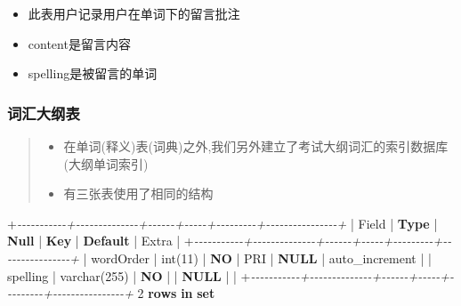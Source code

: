 \documentclass[
]{article}
\newenvironment{Shaded}{}{}
\newcommand{\CommentTok}[1]{\textcolor[rgb]{0.38,0.63,0.69}{\textit{#1}}}
\newcommand{\DataTypeTok}[1]{\textcolor[rgb]{0.56,0.13,0.00}{#1}}
\newcommand{\DecValTok}[1]{\textcolor[rgb]{0.25,0.63,0.44}{#1}}
\newcommand{\KeywordTok}[1]{\textcolor[rgb]{0.00,0.44,0.13}{\textbf{#1}}}
\newcommand{\NormalTok}[1]{#1}
\newcommand{\OperatorTok}[1]{\textcolor[rgb]{0.40,0.40,0.40}{#1}}
\begin{document}
\begin{itemize}
\item
  此表用户记录用户在单词下的留言批注
\item
  content是留言内容
\item
  spelling是被留言的单词
\end{itemize}

\hypertarget{ux8bcdux6c47ux5927ux7eb2ux8868}{%
\subsubsection{词汇大纲表}\label{ux8bcdux6c47ux5927ux7eb2ux8868}}

\begin{quote}
\begin{itemize}
\item
  在单词(释义)表(词典)之外,我们另外建立了考试大纲词汇的索引数据库(大纲单词索引)
\item
  有三张表使用了相同的结构
\end{itemize}
\end{quote}

\begin{Shaded}
\begin{Highlighting}[]
\OperatorTok{+}\CommentTok{{-}{-}{-}{-}{-}{-}{-}{-}{-}{-}{-}+{-}{-}{-}{-}{-}{-}{-}{-}{-}{-}{-}{-}{-}{-}+{-}{-}{-}{-}{-}{-}+{-}{-}{-}{-}{-}+{-}{-}{-}{-}{-}{-}{-}{-}{-}+{-}{-}{-}{-}{-}{-}{-}{-}{-}{-}{-}{-}{-}{-}{-}{-}+}
\NormalTok{| Field     | }\KeywordTok{Type}\NormalTok{         | }\KeywordTok{Null}\NormalTok{ | }\KeywordTok{Key}\NormalTok{ | }\KeywordTok{Default}\NormalTok{ | Extra          |}
\OperatorTok{+}\CommentTok{{-}{-}{-}{-}{-}{-}{-}{-}{-}{-}{-}+{-}{-}{-}{-}{-}{-}{-}{-}{-}{-}{-}{-}{-}{-}+{-}{-}{-}{-}{-}{-}+{-}{-}{-}{-}{-}+{-}{-}{-}{-}{-}{-}{-}{-}{-}+{-}{-}{-}{-}{-}{-}{-}{-}{-}{-}{-}{-}{-}{-}{-}{-}+}
\NormalTok{| wordOrder | }\DataTypeTok{int}\NormalTok{(}\DecValTok{11}\NormalTok{)      | }\KeywordTok{NO}\NormalTok{   | PRI | }\KeywordTok{NULL}\NormalTok{    | auto\_increment |}
\NormalTok{| spelling  | }\DataTypeTok{varchar}\NormalTok{(}\DecValTok{255}\NormalTok{) | }\KeywordTok{NO}\NormalTok{   |     | }\KeywordTok{NULL}\NormalTok{    |                |}
\OperatorTok{+}\CommentTok{{-}{-}{-}{-}{-}{-}{-}{-}{-}{-}{-}+{-}{-}{-}{-}{-}{-}{-}{-}{-}{-}{-}{-}{-}{-}+{-}{-}{-}{-}{-}{-}+{-}{-}{-}{-}{-}+{-}{-}{-}{-}{-}{-}{-}{-}{-}+{-}{-}{-}{-}{-}{-}{-}{-}{-}{-}{-}{-}{-}{-}{-}{-}+}
\DecValTok{2} \KeywordTok{rows} \KeywordTok{in} \KeywordTok{set}
\end{Highlighting}
\end{Shaded}
\end{document}
